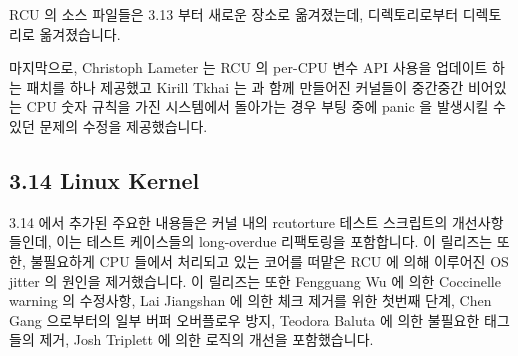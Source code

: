 RCU 의 소스 파일들은 3.13 부터 새로운 장소로 옮겨졌는데, 
디렉토리로부터  디렉토리로 옮겨졌습니다.

마지막으로, Christoph Lameter 는 RCU 의 per-CPU 변수 API 사용을 업데이트 하는
패치를 하나 제공했고 Kirill Tkhai 는  과 함께
만들어진 커널들이 중간중간 비어있는 CPU 숫자 규칙을 가진 시스템에서 돌아가는
경우 부팅 중에 panic 을 발생시킬 수 있던 문제의 수정을 제공했습니다.

\subsection{3.14 Linux Kernel}

3.14 에서 추가된 주요한 내용들은 커널 내의 rcutorture 테스트 스크립트의
개선사항들인데, 이는 테스트 케이스들의 long-overdue 리팩토링을 포함합니다.
이 릴리즈는 또한, 불필요하게  CPU 들에서 처리되고 있는 코어를
떠맡은 RCU 에 의해 이루어진 OS jitter 의 원인을 제거했습니다.
이 릴리즈는 또한 Fengguang Wu 에 의한 Coccinelle warning 의 수정사항, Lai
Jiangshan 에 의한  체크 제거를 위한 첫번째 단계,
Chen Gang 으로부터의 일부 버퍼 오버플로우 방지, Teodora Baluta 에 의한 불필요한
 태그들의 제거, Josh Triplett 에 의한 
로직의 개선을 포함했습니다.

